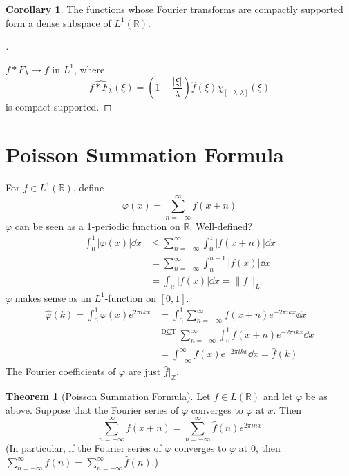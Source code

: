 \documentclass{article}
\theoremstyle{definition}
\newtheorem{thm}{Theorem}
\newtheorem{cor}{Corollary}
\newenvironment{proofs}[1][\proofname]{%
  \begin{proof}[#1]$ $\par\nobreak\ignorespaces
}{%
  \end{proof}
}
\newcommand{\RR}{\mathbb R}
\newcommand{\ZZ}{\mathbb Z}
\begin{document}
\begin{cor}
	The functions whose Fourier transforms are compactly supported form a dense subspace of $L^1(\RR)$.
\end{cor}

\begin{proofs}
	$f*F_\lambda \to f$ in $L^1$, where 
	\[
		\widehat{f*F_\lambda} (\xi) = \left( 1 - \frac{|\xi|}{\lambda} \right) \widehat{f}(\xi) \chi_{[-\lambda, \lambda]} (\xi)
	\]
	is compact supported.
\end{proofs}

\section{Poisson Summation Formula}

For $f \in L^1(\RR)$, define 
\[
	\varphi(x) = \sum_{n = -\infty}^\infty f(x + n)
\]
$\varphi$ can be seen as a 1-periodic function on $\RR$.
Well-defined?
\[
	\begin{split}
		\int_0^1 |\varphi(x)| \dd{x} &\leq \sum_{n = -\infty}^\infty \int_0^1 |f(x + n)| \dd{x}\\
		&= \sum_{n = -\infty}^\infty \int_n^{n + 1} |f(x)| \dd{x}\\
		&= \int_{\RR} |f(x)| \dd{x} = \|f\|_{L^1}
	\end{split}
\]
$\varphi$ makes sense as an $L^1$-function on $[0, 1]$.
\[
	\begin{split}
		\widehat{\varphi}(k) = \int_0^1 \varphi(x) e^{2 \pi i k x} &= \int_0^1 \sum_{n = -\infty}^\infty f(x + n) e^{-2 \pi i k x} \dd{x}\\
		&\stackrel{\text{DCT}}{=} \sum_{n = -\infty}^\infty \int_0^1 f(x + n) e^{- 2 \pi i k x} \dd{x}\\
		&= \int_{- \infty}^\infty f(x) e^{-2 \pi i k x} \dd{x} = \widehat{f}(k)
	\end{split}
\]
The Fourier coefficients of $\varphi$ are just $\widehat{f}|_{\ZZ}$.

\begin{thm}[Poisson Summation Formula]
	Let $f \in L(\RR)$ and let $\varphi$ be as above.
	Suppose that the Fourier series of $\varphi$ converges to $\varphi$ at $x$.
	Then
	\[
		\sum_{n = -\infty}^\infty f(x + n) = \sum_{n = -\infty}^\infty \widehat{f}(n) e^{2 \pi i n x}
	\]
	(In particular, if the Fourier series of $\varphi$ converges to $\varphi$ at 0, then $\sum_{n = -\infty}^\infty f(n) = \sum_{n = -\infty}^\infty \widehat{f}(n)$.)
\end{thm}
\end{document}
